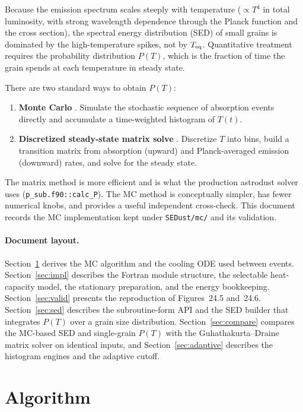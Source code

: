 \documentclass{my_memo}
\newcommand{\Teq}{T_{\rm eq}}
\begin{document}
Because the emission spectrum scales steeply with temperature
($\propto T^4$ in total luminosity, with strong wavelength
dependence through the Planck function and the cross section),
the spectral energy distribution (SED) of small grains is dominated
by the high-temperature spikes, not by $\Teq$.  Quantitative treatment
requires the probability distribution $P(T)$, which is the fraction
of time the grain spends at each temperature in steady state.

There are two standard ways to obtain $P(T)$:
\begin{enumerate}
\item \textbf{Monte Carlo} \citep{DraineAnderson1985}.  Simulate the
  stochastic sequence of absorption events directly and accumulate a
  time-weighted histogram of $T(t)$.
\item \textbf{Discretized steady-state matrix solve}
  \citep{GuhathakurtaDraine1989, DraineLi2001}.  Discretize $T$ into
  bins, build a transition matrix from absorption (upward) and
  Planck-averaged emission (downward) rates, and solve for the steady
  state.
\end{enumerate}
The matrix method is more efficient and is what the production
astrodust solver uses (\texttt{p\_sub.f90::calc\_P}).  The MC method
is conceptually simpler, has fewer numerical knobs, and provides a
useful independent cross-check.  This document records the MC
implementation kept under \verb|SEDust/mc/| and its validation.

\paragraph{Document layout.}
Section~\ref{sec:algo} derives the MC algorithm and the cooling ODE
used between events.  Section~\ref{sec:impl} describes the Fortran
module structure, the selectable heat-capacity model, the stationary
preparation, and the energy bookkeeping.
Section~\ref{sec:valid} presents the reproduction of
\citet{DrainePIIM2011} Figures~24.5 and~24.6.  Section~\ref{sec:sed}
describes the subroutine-form API and the SED builder that integrates
$P(T)$ over a grain size distribution.  Section~\ref{sec:compare}
compares the MC-based SED and single-grain $P(T)$ with the
Guhathakurta--Draine matrix solver on identical inputs, and
Section~\ref{sec:adaptive} describes the histogram engines and the
adaptive cutoff.

\section{Algorithm}\label{sec:algo}
\end{document}

